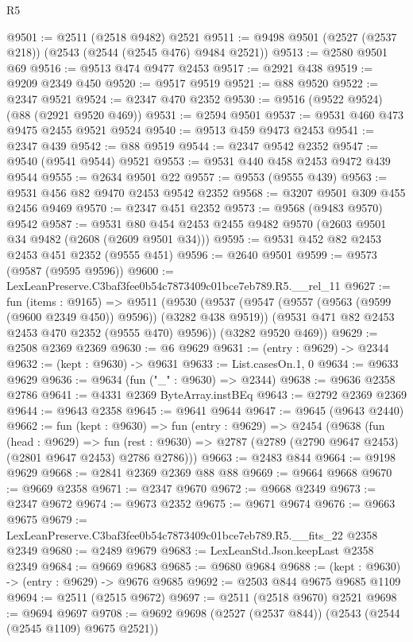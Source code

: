 \begin{lexlean}{R5}
\begin{coremodule}
@9501 := @2511 (@2518 @9482) @2521
@9511 := @9498 @9501 (@2527 (@2537 @218)) (@2543 (@2544 (@2545 @476) @9484 @2521))
@9513 := @2580 @9501 @69
@9516 := @9513 @474 @9477 @2453
@9517 := @2921 @438
@9519 := @9209 @2349 @450
@9520 := @9517 @9519
@9521 := @88 @9520
@9522 := @2347 @9521
@9524 := @2347 @470 @2352
@9530 := @9516 (@9522 @9524) (@88 (@2921 @9520 @469))
@9531 := @2594 @9501
@9537 := @9531 @460 @473 @9475 @2455 @9521 @9524
@9540 := @9513 @459 @9473 @2453
@9541 := @2347 @439
@9542 := @88 @9519
@9544 := @2347 @9542 @2352
@9547 := @9540 (@9541 @9544) @9521
@9553 := @9531 @440 @458 @2453 @9472 @439 @9544
@9555 := @2634 @9501 @22
@9557 := @9553 (@9555 @439)
@9563 := @9531 @456 @82 @9470 @2453 @9542 @2352
@9568 := @3207 @9501 @309 @455 @2456 @9469
@9570 := @2347 @451 @2352
@9573 := @9568 (@9483 @9570) @9542
@9587 := @9531 @80 @454 @2453 @2455 @9482 @9570 (@2603 @9501 @34 @9482 (@2608 (@2609 @9501 @34)))
@9595 := @9531 @452 @82 @2453 @2453 @451 @2352 (@9555 @451)
@9596 := @2640 @9501
@9599 := @9573 (@9587 (@9595 @9596))
@9600 := LexLeanPreserve.C3baf3fee0b54c7873409c01bce7eb789.R5.__rel_11
@9627 := fun (items : @9165) =>
  @9511
    (@9530
      (@9537
        (@9547 (@9557 (@9563 (@9599 (@9600 @2349 @450)) @9596)) (@3282 @438 @9519))
        (@9531 @471 @82 @2453 @2453 @470 @2352 (@9555 @470) @9596))
      (@3282 @9520 @469))
@9629 := @2508 @2369 @2369
@9630 := @6 @9629
@9631 := (entry : @9629) -> @2344
@9632 := (kept : @9630) -> @9631
@9633 := List.casesOn.{1, 0}
@9634 := @9633 @9629
@9636 := @9634 (fun ("_" : @9630) => @2344)
@9638 := @9636 @2358 @2786
@9641 := @4331 @2369 ByteArray.instBEq
@9643 := @2792 @2369 @2369
@9644 := @9643 @2358
@9645 := @9641 @9644
@9647 := @9645 (@9643 @2440)
@9662 := fun (kept : @9630) =>
  fun (entry : @9629) =>
  @2454
    (@9638
      (fun (head : @9629) =>
      fun (rest : @9630) => @2787 (@2789 (@2790 @9647 @2453) (@2801 @9647 @2453) @2786 @2786)))
@9663 := @2483 @844
@9664 := @9198 @9629
@9668 := @2841 @2369 @2369 @88 @88
@9669 := @9664 @9668
@9670 := @9669 @2358
@9671 := @2347 @9670
@9672 := @9668 @2349
@9673 := @2347 @9672
@9674 := @9673 @2352
@9675 := @9671 @9674
@9676 := @9663 @9675
@9679 := LexLeanPreserve.C3baf3fee0b54c7873409c01bce7eb789.R5.__fits_22 @2358 @2349
@9680 := @2489 @9679
@9683 := LexLeanStd.Json.keepLast @2358 @2349
@9684 := @9669 @9683
@9685 := @9680 @9684
@9688 := (kept : @9630) -> (entry : @9629) -> @9676 @9685
@9692 := @2503 @844 @9675 @9685 @1109
@9694 := @2511 (@2515 @9672)
@9697 := @2511 (@2518 @9670) @2521
@9698 := @9694 @9697
@9708 := @9692 @9698 (@2527 (@2537 @844)) (@2543 (@2544 (@2545 @1109) @9675 @2521))

\end{coremodule}
\end{lexlean}
